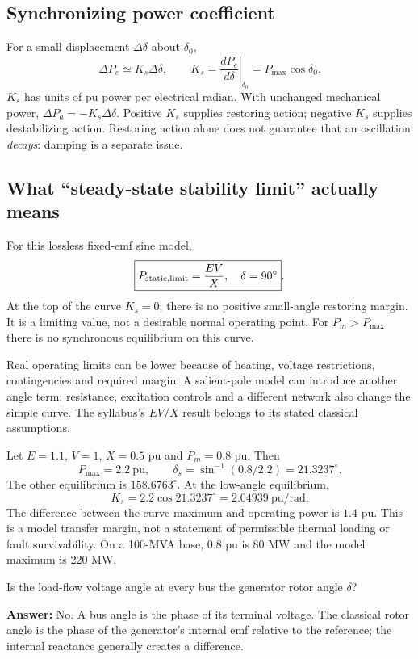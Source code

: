 \documentclass[11pt,a4paper]{article}
\newenvironment{Worked}[1]{\begin{tcolorbox}[breakable=false,colback=white,colframe=teal,colbacktitle=pale,coltitle=ink,title={#1}]}{\end{tcolorbox}}
\newcommand{\checkq}[2]{\begin{tcolorbox}[breakable=false,colback=pale,colframe=teal,coltitle=white,title={Check your understanding}]#1\par\textbf{Answer:} #2\end{tcolorbox}}
\newcommand{\ans}[1]{\boxed{#1}}
\begin{document}
\subsection{Synchronizing power coefficient}
For a small displacement $\Delta\delta$ about $\delta_0$,
\[
\Delta P_e\simeq K_s\Delta\delta,\qquad
\ans{K_s=\left.\frac{dP_e}{d\delta}\right|_{\delta_0}
=P_{\max}\cos\delta_0}.
\]
$K_s$ has units of pu power per electrical radian. With unchanged mechanical power, $\Delta P_a=-K_s\Delta\delta$. Positive $K_s$ supplies restoring action; negative $K_s$ supplies destabilizing action. Restoring action alone does not guarantee that an oscillation \emph{decays}: damping is a separate issue.
\subsection{What ``steady-state stability limit'' actually means}
For this lossless fixed-emf sine model,
\[
\ans{P_{\rm static,limit}=\frac{EV}{X},\quad\delta=90^\circ}.
\]
At the top of the curve $K_s=0$; there is no positive small-angle restoring margin. It is a limiting value, not a desirable normal operating point. For $P_m>P_{\max}$ there is no synchronous equilibrium on this curve.

Real operating limits can be lower because of heating, voltage restrictions, contingencies and required margin. A salient-pole model can introduce another angle term; resistance, excitation controls and a different network also change the simple curve. The syllabus's $EV/X$ result belongs to its stated classical assumptions.
\begin{Worked}{Example 1: transfer margin and synchronizing coefficient}
Let $E=1.1$, $V=1$, $X=0.5$ pu and $P_m=0.8$ pu. Then
\[
P_{\max}=2.2\ \mathrm{pu},\qquad
\delta_s=\sin^{-1}(0.8/2.2)=21.3237^\circ.
\]
The other equilibrium is $158.6763^\circ$. At the low-angle equilibrium,
\[
K_s=2.2\cos21.3237^\circ=2.04939\ \mathrm{pu/rad}.
\]
The difference between the curve maximum and operating power is $1.4$ pu. This is a model transfer margin, not a statement of permissible thermal loading or fault survivability. On a 100-MVA base, $0.8$ pu is 80 MW and the model maximum is 220 MW.
\end{Worked}
\checkq{Is the load-flow voltage angle at every bus the generator rotor angle $\delta$?}{No. A bus angle is the phase of its terminal voltage. The classical rotor angle is the phase of the generator's internal emf relative to the reference; the internal reactance generally creates a difference.}
\end{document}
